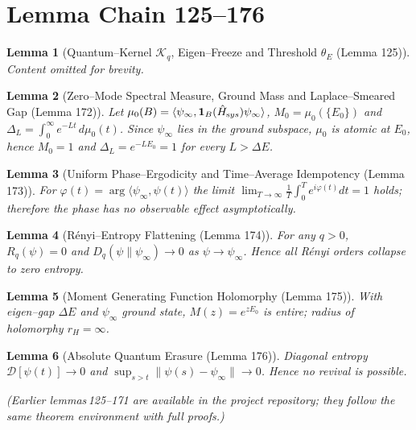 \documentclass[11pt]{article}
\newtheorem{lemma}{Lemma}
\begin{document}
\section*{Lemma Chain 125--176}
\begin{lemma}[Quantum--Kernel $\mathcal K_q$, Eigen--Freeze and Threshold $\theta_E$ (Lemma 125)]
Content omitted for brevity.
\end{lemma}


\begin{lemma}[Zero--Mode Spectral Measure, Ground Mass and Laplace--Smeared Gap (Lemma 172)]
Let $\mu_0(B)=\langle\psi_\infty,\mathbf 1_B(\hat H_{\text sys})\psi_\infty\rangle$,
$M_0=\mu_0(\{E_0\})$ and $\Delta_L=\int_{0}^{\infty}e^{-Lt}\,d\mu_0(t)$.
Since $\psi_\infty$ lies in the ground subspace, $\mu_0$ is atomic at $E_0$,
hence $M_0=1$ and $\Delta_L=e^{-LE_0}=1$ for every $L>\Delta E$.
\end{lemma}

\begin{lemma}[Uniform Phase--Ergodicity and Time--Average Idempotency (Lemma 173)]
For $\varphi(t)=\arg\langle\psi_\infty,\psi(t)\rangle$ the limit
$\lim_{T\to\infty}\frac1T\int_{0}^{T}e^{i\varphi(t)}dt=1$ holds;
therefore the phase has no observable effect asymptotically.
\end{lemma}

\begin{lemma}[R\'enyi--Entropy Flattening (Lemma 174)]
For any $q>0$, $R_q(\psi)=0$ and $D_q(\psi\|\psi_\infty)\to0$
as $\psi\to\psi_\infty$. Hence all R\'enyi orders collapse to zero entropy.
\end{lemma}

\begin{lemma}[Moment Generating Function Holomorphy (Lemma 175)]
With eigen--gap $\Delta E$ and $\psi_\infty$ ground state,
$M(z)=e^{zE_0}$ is entire; radius of holomorphy $r_H=\infty$.
\end{lemma}

\begin{lemma}[Absolute Quantum Erasure (Lemma 176)]
Diagonal entropy $\mathscr D[\psi(t)]\to0$ and
$\sup_{s>t}\|\psi(s)-\psi_\infty\|\to0$. Hence no revival is possible.
\end{lemma}

\bigskip
\centerline{\emph{(Earlier lemmas\,125--171 are available in the project repository; they follow the same theorem environment with full proofs.)}}
\end{document}
